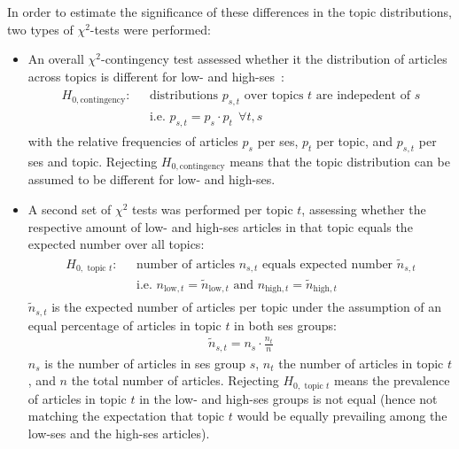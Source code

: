In order to estimate the significance of these differences in the topic distributions, two types of $\chi^2$-tests were performed:
\begin{itemize}
    \item An overall $\chi^2$-contingency test assessed whether it the distribution of articles across topics is different for low- and high-\gls{ses}~\autocite[p. 430]{fahrmeir_spezielle_2016}:
    \begin{align}
        \begin{split}\label{eq:h0_contingency}
            H_{0, \text{contingency}}: ~~~ &\text{distributions } p_{s, t} \text{ over topics } t \text{ are indepedent of } s\\
        & \text{i.e. } p_{s, t} = p_s \cdot p_t ~~ \forall t, s
        \end{split}
    \end{align}
    with the relative frequencies of articles $p_s$ per \gls{ses}, $p_t$ per topic, and $p_{s, t}$ per \gls{ses} and topic. Rejecting $H_{0, \text{contingency}}$ means that the topic distribution can be assumed to be different for low- and high-\gls{ses}.

    \item A second set of $\chi^2$ tests was performed per topic $t$, assessing whether the respective amount of low- and high-\gls{ses} articles in that topic equals the expected number over all topics:
    \begin{align}
        \begin{split}\label{eq:h0_topic}
            H_{0, \text{ topic }t}: ~~~ &\text{number of articles } n_{s, t} \text{ equals expected number } \tilde n_{s, t} \\
            & \text{i.e. } n_{\text{low}, t} = \tilde n_{\text{low}, t} \text{ and } n_{\text{high}, t} = \tilde n_{\text{high}, t}
        \end{split}
    \end{align}
    $\tilde n_{s, t}$ is the expected number of articles per topic under the assumption of an equal percentage of articles in topic $t$ in both \gls{ses} groups:
    \begin{align}
        \tilde n_{s, t} = n_s \cdot \frac{n_t}{n}
    \end{align}
    $n_s$ is the number of articles in \gls{ses} group $s$, $n_t$ the number of articles in topic $t$, and $n$ the total number of articles. Rejecting $H_{0, \text{ topic }t}$ means the prevalence of articles in topic $t$ in the low- and high-\gls{ses} groups is not equal (hence not matching the expectation that topic $t$ would be equally prevailing among the low-\gls{ses} and the high-\gls{ses} articles).
\end{itemize}

